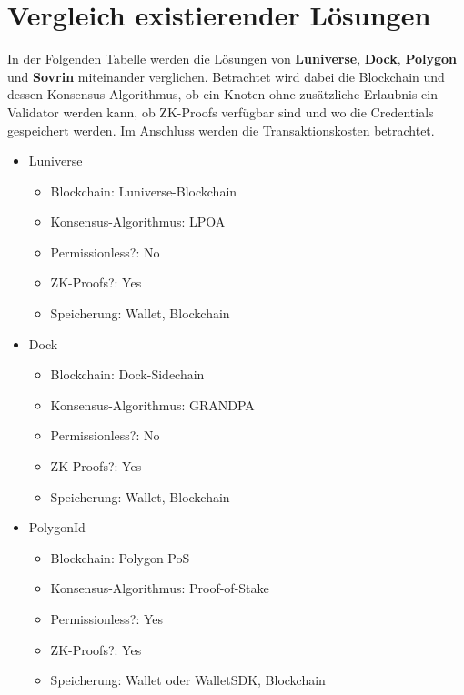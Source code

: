 \section{Vergleich existierender Lösungen}
\label{cha:vergleich Lösungen}
In der Folgenden Tabelle werden die Lösungen von \textbf{Luniverse}, \textbf{Dock}, \textbf{Polygon} und \textbf{Sovrin} miteinander verglichen. Betrachtet wird dabei die Blockchain und dessen Konsensus-Algorithmus, ob ein Knoten ohne zusätzliche Erlaubnis ein Validator werden kann, ob ZK-Proofs verfügbar sind und wo die Credentials gespeichert werden. Im Anschluss werden die Transaktionskosten betrachtet.

\begin{itemize}
	
	
	
	\item Luniverse
	\begin{itemize}
		\item Blockchain: Luniverse-Blockchain
		\item Konsensus-Algorithmus: LPOA
		\item Permissionless?: No
		\item ZK-Proofs?: Yes
		\item Speicherung: Wallet, Blockchain
	\end{itemize}
	
	\item Dock
	\begin{itemize}
		\item Blockchain: Dock-Sidechain
		\item Konsensus-Algorithmus: GRANDPA
		\item Permissionless?: No
		\item ZK-Proofs?: Yes
		\item Speicherung: Wallet, Blockchain
	\end{itemize}
	
	\item PolygonId
	\begin{itemize}
		\item Blockchain: Polygon PoS
		\item Konsensus-Algorithmus: Proof-of-Stake
		\item Permissionless?: Yes
		\item ZK-Proofs?: Yes
		\item Speicherung: Wallet oder WalletSDK, Blockchain
	\end{itemize}
	

\end{itemize}
